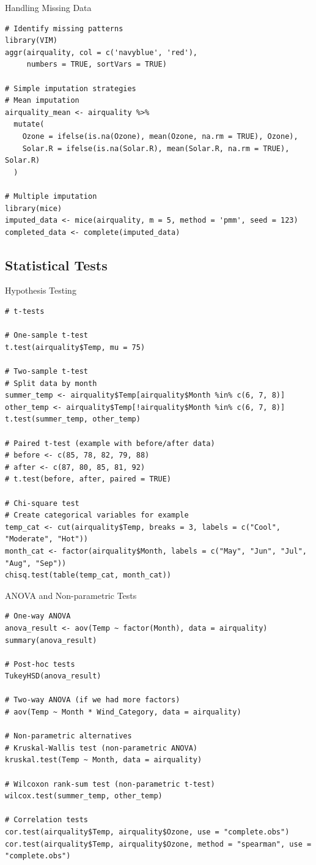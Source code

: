 \documentclass[aspectratio=169]{beamer}
\begin{document}
\begin{frame}[fragile]{Handling Missing Data}
\begin{lstlisting}
# Identify missing patterns
library(VIM)
aggr(airquality, col = c('navyblue', 'red'),
     numbers = TRUE, sortVars = TRUE)

# Simple imputation strategies
# Mean imputation
airquality_mean <- airquality %>%
  mutate(
    Ozone = ifelse(is.na(Ozone), mean(Ozone, na.rm = TRUE), Ozone),
    Solar.R = ifelse(is.na(Solar.R), mean(Solar.R, na.rm = TRUE), Solar.R)
  )

# Multiple imputation
library(mice)
imputed_data <- mice(airquality, m = 5, method = 'pmm', seed = 123)
completed_data <- complete(imputed_data)
\end{lstlisting}
\end{frame}

\subsection{Statistical Tests}

\begin{frame}[fragile]{Hypothesis Testing}
\begin{lstlisting}
# t-tests

# One-sample t-test
t.test(airquality$Temp, mu = 75)

# Two-sample t-test
# Split data by month
summer_temp <- airquality$Temp[airquality$Month %in% c(6, 7, 8)]
other_temp <- airquality$Temp[!airquality$Month %in% c(6, 7, 8)]
t.test(summer_temp, other_temp)

# Paired t-test (example with before/after data)
# before <- c(85, 78, 82, 79, 88)
# after <- c(87, 80, 85, 81, 92)
# t.test(before, after, paired = TRUE)

# Chi-square test
# Create categorical variables for example
temp_cat <- cut(airquality$Temp, breaks = 3, labels = c("Cool", "Moderate", "Hot"))
month_cat <- factor(airquality$Month, labels = c("May", "Jun", "Jul", "Aug", "Sep"))
chisq.test(table(temp_cat, month_cat))
\end{lstlisting}
\end{frame}

\begin{frame}[fragile]{ANOVA and Non-parametric Tests}
\begin{lstlisting}
# One-way ANOVA
anova_result <- aov(Temp ~ factor(Month), data = airquality)
summary(anova_result)

# Post-hoc tests
TukeyHSD(anova_result)

# Two-way ANOVA (if we had more factors)
# aov(Temp ~ Month * Wind_Category, data = airquality)

# Non-parametric alternatives
# Kruskal-Wallis test (non-parametric ANOVA)
kruskal.test(Temp ~ Month, data = airquality)

# Wilcoxon rank-sum test (non-parametric t-test)
wilcox.test(summer_temp, other_temp)

# Correlation tests
cor.test(airquality$Temp, airquality$Ozone, use = "complete.obs")
cor.test(airquality$Temp, airquality$Ozone, method = "spearman", use = "complete.obs")
\end{lstlisting}
\end{frame}
\end{document}
